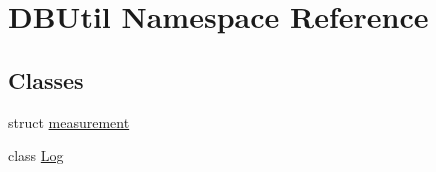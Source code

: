 \hypertarget{namespace_d_b_util}{\section{D\-B\-Util Namespace Reference}
\label{namespace_d_b_util}
}
\subsection*{Classes}
\begin{DoxyCompactItemize}
\item 
struct \hyperlink{struct_d_b_util_1_1measurement}{measurement}
\item 
class \hyperlink{class_d_b_util_1_1_log}{Log}
\end{DoxyCompactItemize}
